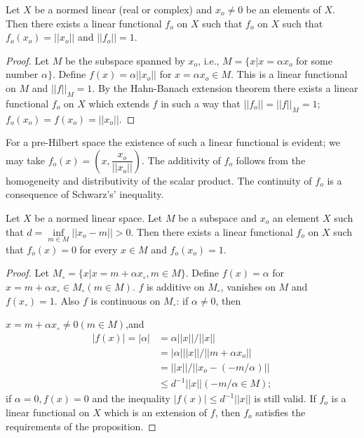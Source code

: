 \begin{prop*}%
 Let $X$ be a normed linear (real or complex) and $x_o \neq 0$ be an
 elements of $X$. Then there exists a linear functional $f_o$ on $X$
 such that $f_o$ on $X$ such that $f_o (x_o)= || x_o || $ and $||
 f_o || =1$. 
\end{prop*}

\begin{proof}
 Let $M$ be the subspace spanned by $x_o$, i.e., $M= \{ x | x=
 \alpha x_o$ for some number $\alpha \}$. Define $f(x)= \alpha
 ||x_o ||$ for $x = \alpha x_o \in M$. This is a linear functional
 on $M$ and $|| f ||_M=1$. By the Hahn-Banach extension theorem there
 exists a linear functional $f_o$ on $X$ which extends $f$ in such a
 way that $|| f_o|| = || f ||_M=1$; $f_o (x_o)= f(x_o) = ||x_o ||$. 
\end{proof}

\begin{remark*}
 For a pre-Hilbert space the existence of such a linear functional is
 evident; we may take $f_o(x)= (x, \dfrac{x_o}{|| x_o ||})$. The
 additivity of $f_o$ follows from the homogeneity and distributivity
 of the scalar product. The continuity of $f_o$ is a consequence of
 Schwarz's' inequality. 
\end{remark*}

\begin{prop*}
 Let $X$ be a normed linear space. Let $M$ be a subspace and $x_o$
 an element $X$ such that $d= \inf\limits_{m \in M} || x_o -m ||
 >0$. Then there exists a linear functional $f_o$ on $X$ such that
 $f_o (x) =0$ for every $x \in M$ and $f_o (x_o)=1$. 
\end{prop*}

\begin{proof}
 Let $M_\circ = \{ x | x=m + \alpha x_\circ , m \in M \}$. Define $f(x)=
 \alpha$ for $x= m+ \alpha x_\circ \in M_\circ(m \in M)$. $f$ is
 additive on $M_\circ$, 
 vanishes on $M$ and $f(x_\circ)=1$. Also $f$ is continuous on $M_\circ$: if
 $\alpha \neq 0$, then 

 $x =m + \alpha x_\circ \neq 0 (m \in M)$,\pageoriginale and 
 \begin{align*}
  |f (x)| = |\alpha| & = \alpha ||x|| \big / || x|| \\
  & =|\alpha| ||x|| \big/ ||m+ \alpha x_o || \\
  & =||x|| \big / ||x_o -(-m/ \alpha) ||\\
  & \le d^{-1} ||x|| (-m/\alpha \in M);
 \end{align*}
 if $\alpha =0, f (x) = 0$ and the inequality $|f (x)| \le d^{-1}
 ||x||$ is still valid. If $f_o$ is a linear functional on $X$ which
 is an extension of $f$, then $f_o$ satisfies the requirements of the
 proposition. 
\end{proof}


